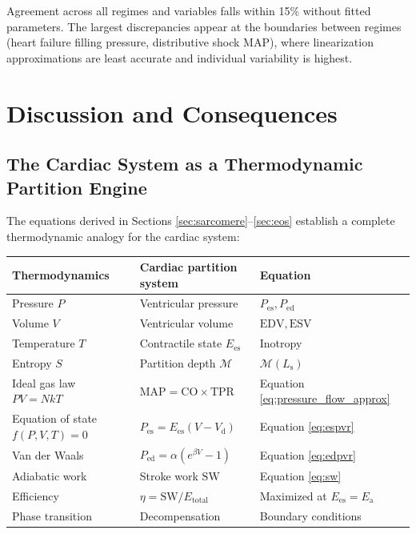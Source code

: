 \documentclass[12pt,a4paper]{article}
\theoremstyle{remark}
\newcommand{\Ees}{E_{\mathrm{es}}}
\newcommand{\Ea}{E_{\mathrm{a}}}
\newcommand{\Vd}{V_{\mathrm{d}}}
\newcommand{\Pes}{P_{\mathrm{es}}}
\newcommand{\CO}{\mathrm{CO}}
\newcommand{\MAP}{\mathrm{MAP}}
\newcommand{\TPR}{\mathrm{TPR}}
\newcommand{\EDV}{\mathrm{EDV}}
\newcommand{\ESV}{\mathrm{ESV}}
\newcommand{\SW}{\mathrm{SW}}
\newcommand{\Ls}{L_{\mathrm{s}}}
\begin{document}
Agreement across all regimes and variables falls within 15\% without fitted parameters. The largest discrepancies appear at the boundaries between regimes (heart failure filling pressure, distributive shock MAP), where linearization approximations are least accurate and individual variability is highest.

\section{Discussion and Consequences}
\label{sec:discussion}

\subsection{The Cardiac System as a Thermodynamic Partition Engine}

The equations derived in Sections \ref{sec:sarcomere}--\ref{sec:eos} establish a complete thermodynamic analogy for the cardiac system:

\begin{center}
\begin{tabular}{lll}
\toprule
\textbf{Thermodynamics} & \textbf{Cardiac partition system} & \textbf{Equation} \\
\midrule
Pressure $P$ & Ventricular pressure & $P_{\mathrm{es}}, P_{\mathrm{ed}}$ \\
Volume $V$ & Ventricular volume & $\EDV, \ESV$ \\
Temperature $T$ & Contractile state $\Ees$ & Inotropy \\
Entropy $S$ & Partition depth $\mathcal{M}$ & $\mathcal{M}(\Ls)$ \\
Ideal gas law $PV = NkT$ & $\MAP = \CO \times \TPR$ & Equation \ref{eq:pressure_flow_approx} \\
Equation of state $f(P,V,T)=0$ & $\Pes = \Ees(V-\Vd)$ & Equation \ref{eq:espvr} \\
Van der Waals & $P_{\mathrm{ed}} = \alpha(e^{\beta V}-1)$ & Equation \ref{eq:edpvr} \\
Adiabatic work & Stroke work $\SW$ & Equation \ref{eq:sw} \\
Efficiency & $\eta = \SW/E_{\mathrm{total}}$ & Maximized at $\Ees = \Ea$ \\
Phase transition & Decompensation & Boundary conditions \\
\bottomrule
\end{tabular}
\end{center}
\end{document}
